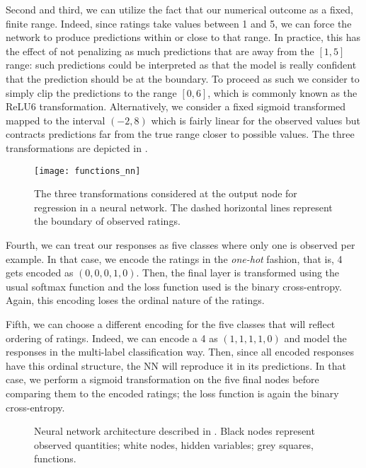\documentclass[bj, preprint]{imsart}
\begin{document}
Second and third, we can utilize the fact that our numerical outcome as a fixed, finite range. Indeed, since ratings take values between 1 and 5, we can force the network to produce predictions within or close to that range. In practice, this has the effect of not penalizing as much predictions that are away from the $[1,5]$ range: such predictions could be interpreted as that the model is really confident that the prediction should be at the boundary. To proceed as such we consider to simply clip the predictions to the range $[0,6]$, which is commonly known as the ReLU6 transformation. Alternatively, we consider a fixed sigmoid transformed mapped to the interval $(-2,8)$ which is fairly linear for the observed values but contracts predictions far from the true range closer to possible values. The three transformations are depicted in .

\begin{figure}[h]
\centering
\texttt{[image: functions\_nn]}
\caption{The three transformations considered at the output node for regression in a neural network. The dashed horizontal lines represent the boundary of observed ratings. }\label{fig:method.models.nn.functions}
\end{figure}

Fourth, we can treat our responses as five classes where only one is observed per example. In that case, we encode the ratings in the \textit{one-hot} fashion, that is, 4 gets encoded as $(0,0,0,1,0)$. Then, the final layer is transformed using the usual softmax function and the loss function used is the binary cross-entropy. Again, this encoding loses the ordinal nature of the ratings.

Fifth, we can choose a different encoding for the five classes that will reflect ordering of ratings. Indeed, we can encode a 4 as $(1,1,1,1,0)$ and model the responses in the multi-label classification way. Then, since all encoded responses have this ordinal structure, the NN will reproduce it in its predictions. In that case, we perform a sigmoid transformation on the five final nodes before comparing them to the encoded ratings; the loss function is again the binary cross-entropy.




\begin{figure}
\centering

\caption{Neural network architecture described in . Black nodes represent observed quantities; white nodes, hidden variables; grey squares, functions.}
\label{fig:method.models.nn}
\end{figure}
\end{document}

